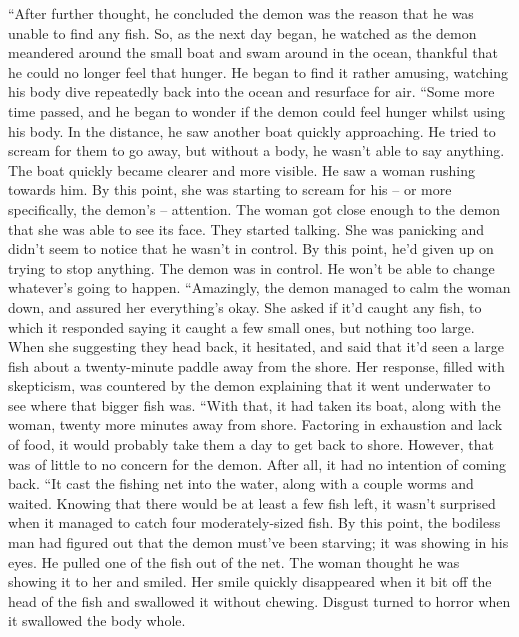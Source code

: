 \documentclass[openany, 12pt]{book}
\newcommand\tab[1][1cm]{\hspace*{#1}}
\begin{document}
\newline
\tab
``After further thought, he concluded the demon was the reason that he was unable to find any fish. So, as the next day began, he watched as the demon meandered around the small boat and swam around in the ocean, thankful that he could no longer feel that hunger. He began to find it rather amusing, watching his body dive repeatedly back into the ocean and resurface for air. 
\newline
\tab
``Some more time passed, and he began to wonder if the demon could feel hunger whilst using his body. In the distance, he saw another boat quickly approaching. He tried to scream for them to go away, but without a body, he wasn’t able to say anything. The boat quickly became clearer and more visible. He saw a woman rushing towards him. By this point, she was starting to scream for his -- or more specifically, the demon’s -- attention. The woman got close enough to the demon that she was able to see its face. They started talking. She was panicking and didn’t seem to notice that he wasn’t in control. By this point, he’d given up on trying to stop anything. The demon was in control. He won’t be able to change whatever’s going to happen.
\newline
\tab
``Amazingly, the demon managed to calm the woman down, and assured her everything’s okay. She asked if it’d caught any fish, to which it responded saying it caught a few small ones, but nothing too large. When she suggesting they head back, it hesitated, and said that it’d seen a large fish about a twenty-minute paddle away from the shore. Her response, filled with skepticism, was countered by the demon explaining that it went underwater to see where that bigger fish was. 
\newline
\tab
``With that, it had taken its boat, along with the woman, twenty more minutes away from shore. Factoring in exhaustion and lack of food, it would probably take them a day to get back to shore. However, that was of little to no concern for the demon. After all, it had no intention of coming back. 
\newline
\tab
``It cast the fishing net into the water, along with a couple worms and waited. Knowing that there would be at least a few fish left, it wasn’t surprised when it managed to catch four moderately-sized fish. By this point, the bodiless man had figured out that the demon must’ve been starving; it was showing in his eyes. He pulled one of the fish out of the net. The woman thought he was showing it to her and smiled. Her smile quickly disappeared when it bit off the head of the fish and swallowed it without chewing. Disgust turned to horror when it swallowed the body whole.
\end{document}
